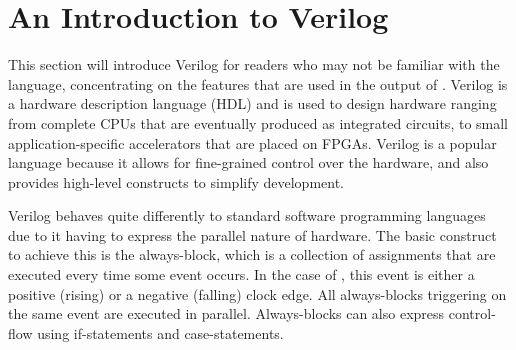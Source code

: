 \section{An Introduction to Verilog}%
\label{sec:bg:intro-to-verilog}

This section will introduce Verilog for readers who may not be familiar with the
language, concentrating on the features that are used in the output of
\vericert{}.  Verilog is a hardware description language (HDL) and is used to
design hardware ranging from complete CPUs that are eventually produced as
integrated circuits, to small application-specific accelerators that are placed
on FPGAs.  Verilog is a popular language because it allows for fine-grained
control over the hardware, and also provides high-level constructs to simplify
development.

Verilog behaves quite differently to standard software programming languages due
to it having to express the parallel nature of hardware.  The basic construct to
achieve this is the always-block, which is a collection of assignments that are
executed every time some event occurs.  In the case of \vericert{}, this event
is either a positive (rising) or a negative (falling) clock edge.  All
always-blocks triggering on the same event are executed in
parallel. Always-blocks can also express control-flow using if-statements and
case-statements.


